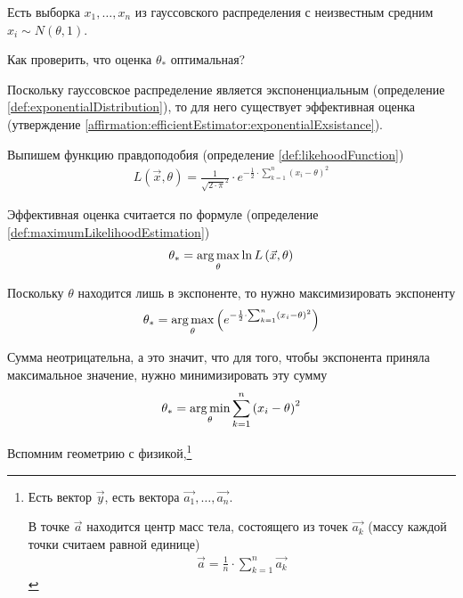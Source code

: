 \begin{example}\label{example:leastSquares:scalarOptimalEstimator}
    Есть выборка $x_1, \dots, x_n$ из гауссовского распределения с неизвестным
    средним $x_i \sim N\left( \theta, 1 \right)$.

    Как проверить, что оценка $\theta_*$ оптимальная?

    Поскольку гауссовское распределение является экспоненциальным
    (определение \ref{def:exponentialDistribution}),
    то для него существует эффективная оценка
    (утверждение \ref{affirmation:efficientEstimator:exponentialExsistance}).

    Выпишем функцию правдоподобия (определение \ref{def:likehoodFunction})
    \begin{align*}
        L\left( \vec{x}, \theta \right)
        = \frac{1}{\sqrt{2 \cdot \pi}^2}
            \cdot e^{- \frac{1}{2}
                \cdot \sum_{k=1}^{n}\left( x_i - \theta \right)^2}
    \end{align*}

    Эффективная оценка считается по формуле (определение
    \ref{def:maximumLikelihoodEstimation})
    \begin{align*}
        \theta_* = \underset{\theta}{\operatorname{arg\,max}}\ln{L\left( \vec{x},\theta \right)}
    \end{align*}

    Поскольку $\theta$ находится лишь в экспоненте, то нужно максимизировать
    экспоненту
    \begin{align*}
        \theta_* = \underset{\theta}{\operatorname{arg\,max}}\left( e^{- \frac{1}{2}
            \cdot \sum_{k=1}^{n}\left( x_i - \theta \right)^2} \right)
    \end{align*}

    Сумма неотрицательна, а это значит, что для того, чтобы экспонента приняла
    максимальное значение, нужно минимизировать эту сумму
    \begin{align*}
        \theta_* = \underset{\theta}{\operatorname{arg\,min}}
            \sum_{k=1}^{n}\left( x_i - \theta \right)^2
    \end{align*}

    Вспомним геометрию с физикой,\footnote{
        Есть вектор $\vec{y}$, есть вектора $\vec{a_1}, \dots, \vec{a_n}$.

        В точке $\vec{a}$ находится центр масс тела, состоящего из точек
        $\vec{a_k}$ (массу каждой точки считаем равной единице)
        \begin{align*}
            \vec{a} = \frac{1}{n} \cdot \sum_{k=1}^{n} \vec{a_k}
        \end{align*}

}
\end{example}
